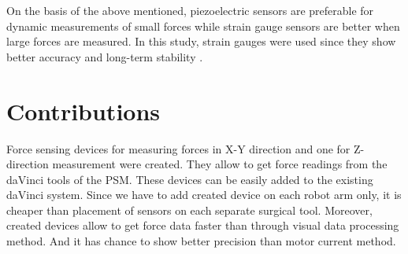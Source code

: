 On the basis of the above mentioned, piezoelectric sensors are preferable for dynamic measurements of small forces while strain gauge sensors are better when large forces are measured. In this study, strain gauges were used since they show better accuracy and long-term stability \cite{SGandP1,SGandP2}.

\section{Contributions}
\label{sec:MyAppr}
Force sensing devices for measuring forces in X-Y direction and one for Z-direction measurement were created. They allow to get force readings from the daVinci tools of the PSM.  These devices can be easily added to the existing daVinci system. Since we have to add created device on each robot arm only, it is cheaper than placement of sensors on each separate surgical tool.  Moreover, created devices allow to get force data faster than through visual data processing method. And it has chance to show better precision than motor current method.

